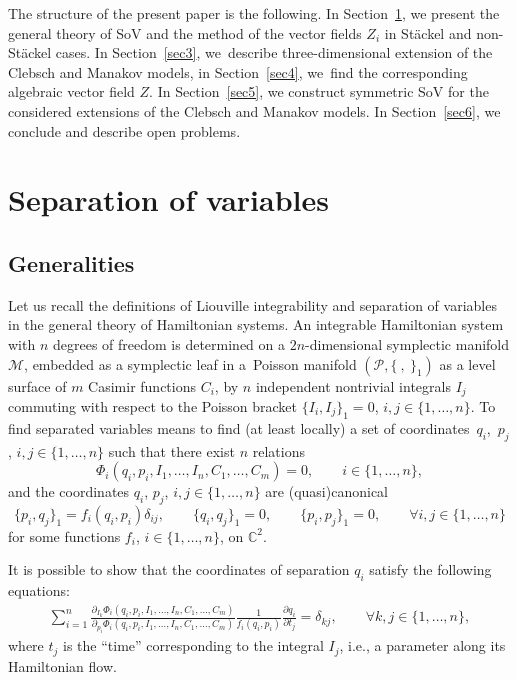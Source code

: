 \documentclass[pdftex]{sigma}
\def\d{\delta}
\numberwithin{equation}{section}
\begin{document}
 The structure of the present paper is the following. In Section~\ref{sec2}, we present the general theory of SoV and the method of the vector fields $Z_i$ in St\"ackel and non-St\"ackel cases. In Section~\ref{sec3}, we~describe three-dimensional extension of the Clebsch and Manakov models, in Section~\ref{sec4}, we~find the corresponding algebraic vector field $Z$. In Section~\ref{sec5}, we construct symmetric SoV for the considered extensions of the Clebsch and Manakov models. In Section~\ref{sec6}, we conclude and describe open problems.

\section{Separation of variables}\label{sec2}

\subsection{Generalities}\label{general}
Let us recall the definitions of Liouville integrability and
separation of variables in the general theory of Hamiltonian
systems. An integrable Hamiltonian system with $n$ degrees of
freedom is determined on a $2n$-dimensional symplectic manifold
$\mathcal{M}$, embedded as a symplectic leaf in a~Poisson
manifold $(\mathcal{P},\{\ ,\ \}_1)$ as a level surface of $m$
Casimir functions $C_i$, by $n$ independent nontrivial integrals
$I_j$ commuting with respect to the Poisson bracket
$
\{I_i ,I_j\}_1 = 0$, $ i,j \in \{1, \dots, n\}$.
 To find separated variables means to find (at least locally) a set of coordinates~$q_i$,~$p_j$, $i,j \in
\{1, \dots, n\}$ such that there exist $n$ relations
\begin{equation}\label{sepeq0}
 \Phi_i(q_i, p_i,I_1, \dots ,I_n, C_1, \dots ,C_m) = 0, \qquad i\in \{1, \dots, n\},
\end{equation}
and the coordinates $q_i$, $p_j$, $i,j \in \{1, \dots, n\}$ are (quasi)canonical
\[
\{ p_i, q_j \}_1= f_i(q_i,p_i) \d_{ij}, \qquad \{q_i,q_j\}_1=0,\qquad
\{p_i,p_j\}_1=0, \qquad \forall i,j \in \{1, \dots, n\}
\]
for some functions $f_i$, $i\in \{1, \dots, n\}$, on $\mathbb{C}^2$.

It is possible to show \cite{SkrJMP2021}
 that the coordinates of separation $q_i$
 satisfy the following equations:
\begin{gather}\label{abel0}
\sum\limits_{i=1}^n \frac{ {\partial_{I_k} \Phi_i(q_i, p_i, I_1,\dots ,I_n, C_1, \dots ,C_m)} }{ {\partial_{p_i} \Phi_i(q_i, p_i ,I_1, \dots ,I_n, C_1, \dots ,C_m)}}\frac{1}{ f_i(q_i,p_i)} \frac{\partial q_i}{\partial t_j} = \d_{kj}, \qquad \forall k,j\in \{1, \dots, n\},
\end{gather}
where $t_j$ is the ``time'' corresponding to the integral $I_j$, i.e., a parameter along its Hamiltonian flow.
\end{document}
